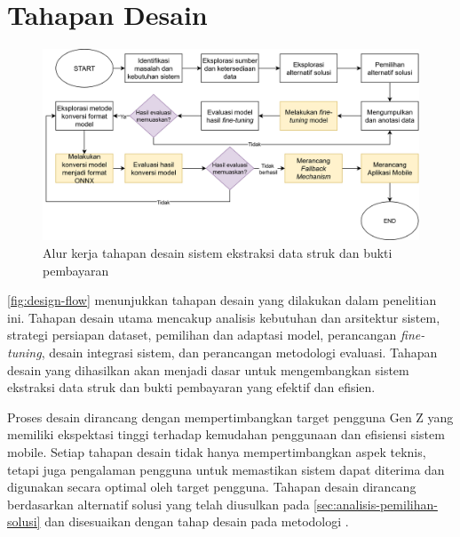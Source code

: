 \section{Tahapan Desain}
\label{sec:tahapan-desain}

\begin{figure}[htbp]
    \centering
    \includegraphics[width=\textwidth]{images/design-flow.png}
    \caption{Alur kerja tahapan desain sistem ekstraksi data struk dan bukti pembayaran}
    \label{fig:design-flow}
\end{figure}

\autoref{fig:design-flow} menunjukkan tahapan desain yang dilakukan dalam penelitian ini. Tahapan desain utama mencakup analisis kebutuhan dan arsitektur sistem, strategi persiapan dataset, pemilihan dan adaptasi model, perancangan \emph{fine-tuning}, desain integrasi sistem, dan perancangan metodologi evaluasi. Tahapan desain yang dihasilkan akan menjadi dasar untuk mengembangkan sistem ekstraksi data struk dan bukti pembayaran yang efektif dan efisien.

Proses desain dirancang dengan mempertimbangkan target pengguna Gen Z yang memiliki ekspektasi tinggi terhadap kemudahan penggunaan dan efisiensi sistem mobile. Setiap tahapan desain tidak hanya mempertimbangkan aspek teknis, tetapi juga pengalaman pengguna untuk memastikan sistem dapat diterima dan digunakan secara optimal oleh target pengguna. Tahapan desain dirancang berdasarkan alternatif solusi yang telah diusulkan pada \autoref{sec:analisis-pemilihan-solusi} dan disesuaikan dengan tahap desain pada metodologi \dsrm.











